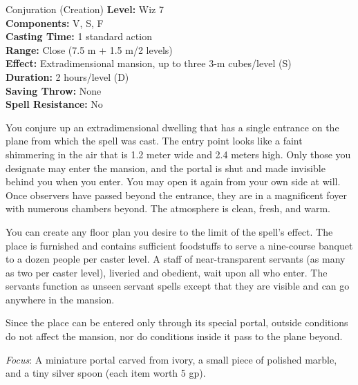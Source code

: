 {Conjuration (Creation)}
{
	\textbf{Level:}
	Wiz 7\\
	\textbf{Components:}
	V, S, F\\
	\textbf{Casting Time:}
	1 standard action\\
	\textbf{Range:}
	Close (7.5 m + 1.5 m/2 levels)\\
	\textbf{Effect:}
	Extradimensional mansion, up to three 3-m cubes/level (S)\\
	\textbf{Duration:}
	2 hours/level (D)\\
	\textbf{Saving Throw:}
	None\\
	\textbf{Spell Resistance:}
	No\\
}
{
	You conjure up an extradimensional dwelling that has a single entrance on the plane from which the spell was cast. The entry point looks like a faint shimmering in the air that is 1.2 meter wide and 2.4 meters high. Only those you designate may enter the mansion, and the portal is shut and made invisible behind you when you enter. You may open it again from your own side at will. Once observers have passed beyond the entrance, they are in a magnificent foyer with numerous chambers beyond. The atmosphere is clean, fresh, and warm.

	You can create any floor plan you desire to the limit of the spell's effect. The place is furnished and contains sufficient foodstuffs to serve a nine-course banquet to a dozen people per caster level. A staff of near-transparent servants (as many as two per caster level), liveried and obedient, wait upon all who enter. The servants function as unseen servant spells except that they are visible and can go anywhere in the mansion.

	Since the place can be entered only through its special portal, outside conditions do not affect the mansion, nor do conditions inside it pass to the plane beyond.

	\textit{Focus}:
	A miniature portal carved from ivory, a small piece of polished marble, and a tiny silver spoon (each item worth 5 gp).

}
